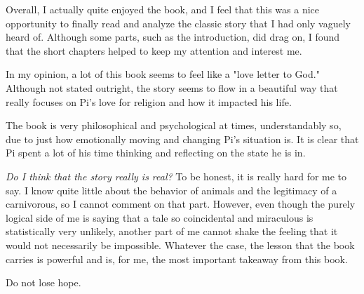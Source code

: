\documentclass[11pt]{article}
\begin{document}
Overall, I actually quite enjoyed the book, and I feel that this was a nice opportunity to finally read and analyze the classic story that I had only vaguely heard of. Although some parts, such as the introduction, did drag on, I found that the short chapters helped to keep my attention and interest me.

In my opinion, a lot of this book seems to feel like a "love letter to God." Although not stated outright, the story seems to flow in a beautiful way that really focuses on Pi's love for religion and how it impacted his life.

The book is very philosophical and psychological at times, understandably so, due to just how emotionally moving and changing Pi's situation is. It is clear that Pi spent a lot of his time thinking and reflecting on the state he is in.

\emph{Do I think that the story really is real?} To be honest, it is really hard for me to say. I know quite little about the behavior of animals and the legitimacy of a carnivorous, so I cannot comment on that part. However, even though the purely logical side of me is saying that a tale so coincidental and miraculous is statistically very unlikely, another part of me cannot shake the feeling that it would not necessarily be impossible. Whatever the case, the lesson that the book carries is powerful and is, for me, the most important takeaway from this book.

Do not lose hope.
\end{document}
